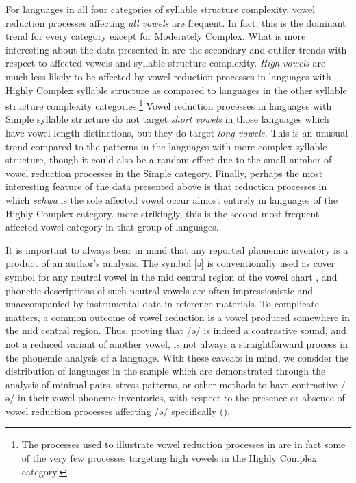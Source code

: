  For languages in all four categories of syllable structure complexity, vowel reduction processes affecting \textit{all vowels} are frequent. In fact, this is the dominant trend for every category except for Moderately Complex. What is more interesting about the data presented in  are the secondary and outlier trends with respect to affected vowels and syllable structure complexity. \textit{High vowels} are much less likely to be affected by vowel reduction processes in languages with Highly Complex syllable structure as compared to languages in the other syllable structure complexity categories.\footnote{{The  processes used to illustrate vowel reduction processes in  are in fact some of the very few processes targeting high vowels in the Highly Complex category.}} Vowel reduction processes in languages with Simple syllable structure do not target \textit{short vowels} in those languages which have vowel length distinctions, but they do target \textit{long vowels.} This is an unusual trend compared to the patterns in the languages with more complex syllable structure, though it could also be a random effect due to the small number of vowel reduction processes in the Simple category. Finally, perhaps the most interesting feature of the data presented above is that reduction processes in which \textit{schwa} is the sole affected vowel occur almost entirely in languages of the Highly Complex category.  more strikingly, this is the second most frequent affected vowel category in that group of languages.

  It is important to always bear in mind that any reported phonemic inventory is a product of an author’s analysis. The symbol [ə] is conventionally used as cover symbol for any neutral vowel in the mid central region of the vowel chart \citep[280]{Laver1994}, and phonetic descriptions of such neutral vowels are often impressionistic and unaccompanied by instrumental data in reference materials. To complicate matters, a common outcome of vowel reduction is a vowel produced somewhere in the mid central region. Thus, proving that /ə/ is indeed a contrastive sound, and not a reduced variant of another vowel, is not always a straightforward process in the phonemic analysis of a language. With these caveats in mind, we consider the distribution of languages in the sample which are demonstrated through the analysis of minimal pairs, stress patterns, or other methods to have contrastive /ə/ in their vowel phoneme inventories, with respect to the presence or absence of vowel reduction processes affecting /ə/ specifically ().

